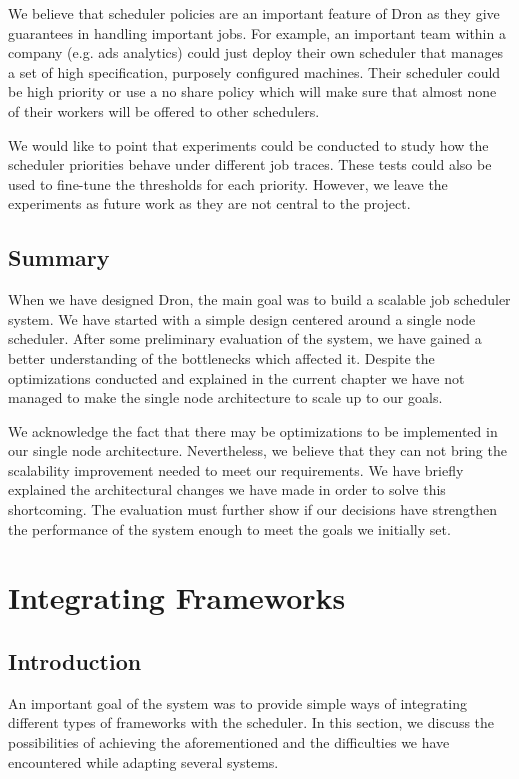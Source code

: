 \documentclass[11pt,a4paper,twoside]{report}
\begin{document}
We believe that scheduler policies are an important feature of Dron as they give guarantees in handling important jobs. For example, an important team within a company (e.g. ads analytics) could just deploy their own scheduler that manages a set of high specification, purposely configured machines. Their scheduler could be high priority or use a no share policy which will make sure that almost none of their workers will be offered to other schedulers.


We would like to point that experiments could be conducted to study how the scheduler priorities behave under different job traces. These tests could also be used to fine-tune the thresholds for each priority. However, we leave the experiments as future work as they are not central to the project.

\section{Summary}
When we have designed Dron, the main goal was to build a scalable job scheduler system. We have started with a simple design centered around a single node scheduler. After some preliminary evaluation of the system, we have gained a better understanding of the bottlenecks which affected it. Despite the optimizations conducted and explained in the current chapter we have not managed to make the single node architecture to scale up to our goals.


We acknowledge the fact that there may be optimizations to be implemented in our single node architecture. Nevertheless, we believe that they can not bring the scalability improvement needed to meet our requirements. We have briefly explained the architectural changes we have made in order to solve this shortcoming. The evaluation must further show if our decisions have strengthen the performance of the system enough to meet the goals we initially set.


\chapter{Integrating Frameworks}
\label{chap:Integration}
\section{Introduction}
An important goal of the system was to provide simple ways of integrating different types of frameworks with the scheduler. In this section, we discuss the possibilities of achieving the aforementioned and the difficulties we have encountered while adapting several systems.
\end{document}
